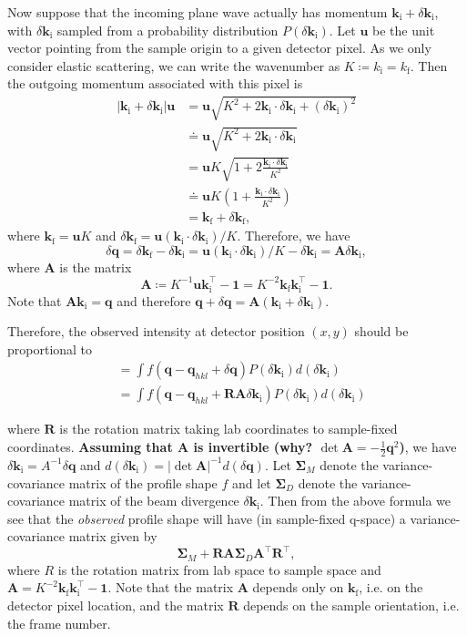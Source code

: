 \documentclass[11pt,a4paper]{article}
\def\v#1{\bm{{#1}}}
\def\tr{^\intercal}
\def\si{\text{i}}
\def\sf{\text{f}}
\def\k{{\v{k}}}
\def\q{{\v{q}}}
\def\bu{\v{u}}
\begin{document}
Now suppose that the incoming plane wave actually has momentum $\k_\si + \delta \k_\si$, with $\delta \k_\si$ sampled from a probability distribution $P(\delta \k_\si)$.
Let $\bu$ be the unit vector pointing from the sample origin to a given detector pixel.
As we only consider elastic scattering,
we can write the wavenumber as $K\coloneqq k_\si = k_\sf$.
Then the outgoing momentum associated with this pixel is
\begin{align}
  |\k_\si + \delta \k_\si| \bu &= \bu \sqrt{K^2  + 2 \k_\si \cdot \delta \k_\si + (\delta \k_\si)^2 } \\
  &\doteq \bu\sqrt{K^2  + 2 \k_\si \cdot \delta \k_\si} \\
  &= \bu K\sqrt{1+ 2\frac{\k_\si \cdot \delta \k_\si}{K^2}} \\
  &\doteq \bu K \left(1 +  \frac{\k_\si \cdot \delta \k_\si}{K^2}\right) \\
  &= \k_\sf + \delta \k_\sf,
\end{align}
where $\k_\sf = \bu K$ and $\delta \k_\sf = \bu(\k_\si \cdot \delta \k_\si) / K$. Therefore, we have
\begin{equation}
  \delta\q
  = \delta \k_\sf - \delta \k_\si = \bu(\k_\si \cdot \delta \k_\si) / K - \delta \k_\si
  = \v{A} \delta \k_\si,
\end{equation}
where $\v{A}$ is the matrix
\begin{equation}
\v{A} \coloneqq K^{-1} \bu \k_\si\tr - \v1 = K^{-2} \k_\sf \k_\si\tr - \v1.
\end{equation}
Note that $\v{A} \k_\si = \q$ and therefore
$\q + \delta \q = \v{A}(\k_\si + \delta \k_\si)$.

Therefore, the observed intensity at detector position $(x,y)$ should be proportional to
\begin{align}
  &= \int f(\q - \q_{hkl} + \delta \q) P(\delta \k_\si) d(\delta \k_\si) \\
  &= \int f(\q - \q_{hkl} + \v{R}\v{A} \delta \k_\si) P(\delta \k_\si) d(\delta \k_\si)
\end{align}

where $\v{R}$ is the rotation matrix taking lab coordinates to sample-fixed coordinates.
\textbf{Assuming that $\v{A}$ is invertible (why? $\det \v{A} = -\frac{1}{2}\q^2$)},
we have $\delta \k_\si = A^{-1} \delta \q$ and $d(\delta \k_\si) = |\det \v{A}|^{-1} d(\delta \q)$.
Let $\v\Sigma_M$ denote the variance-covariance matrix of the profile shape $f$
and let $\v\Sigma_D$ denote the variance-covariance matrix of the beam divergence $\delta \k_\si$.
Then from the above formula we see that the \emph{observed} profile shape will have
(in sample-fixed q-space) a variance-covariance matrix given by
\begin{equation}
  \v\Sigma_M + \v{R} \v{A} \v\Sigma_D \v{A}\tr \v{R}\tr,
\end{equation}
where $R$ is the rotation matrix from lab space to sample space
and $\v{A} = K^{-2} \k_\sf \k_\si\tr - \v1$.
Note that the matrix $\v{A}$ depends only on $\k_\sf$, i.e. on the detector pixel location,
and the matrix $\v{R}$ depends on the sample orientation, i.e. the frame number.
\end{document}
